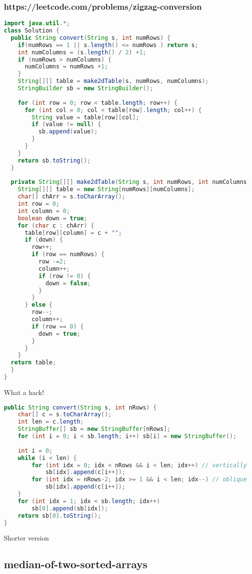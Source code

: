 \documentclass[12pt]{article}
\begin{document}
\subsubsection{https://leetcode.com/problems/zigzag-conversion}
\begin{lstlisting}[language=Java]
import java.util.*;
class Solution {
  public String convert(String s, int numRows) {
    if(numRows == 1 || s.length() <= numRows ) return s;
    int numColumns = (s.length() / 2) +1;
    if (numRows > numColumns) {
      numColumns = numRows +1;
    }
    String[][] table = make2dTable(s, numRows, numColumns);
    StringBuilder sb = new StringBuilder();
        
    for (int row = 0; row < table.length; row++) {
      for (int col = 0; col < table[row].length; col++) {
        String value = table[row][col];
        if (value != null) {
          sb.append(value);
        }
      }
    }
    return sb.toString();
  }
    
  private String[][] make2dTable(String s, int numRows, int numColumns) {
    String[][] table = new String[numRows][numColumns];
    char[] chArr = s.toCharArray();
    int row = 0;
    int column = 0;
    boolean down = true;
    for (char c : chArr) {
      table[row][column] = c + "";
      if (down) {
        row++;
        if (row == numRows) {
          row -=2;
          column++;
          if (row != 0) {
            down = false;
          }
        }
      } else {
        row--;
        column++;
        if (row == 0) {
          down = true;
        }
      }
    }
  return table;
  }   
}
\end{lstlisting}
What a hack!

\begin{lstlisting}[language=Java]
public String convert(String s, int nRows) {
    char[] c = s.toCharArray();
    int len = c.length;
    StringBuffer[] sb = new StringBuffer[nRows];
    for (int i = 0; i < sb.length; i++) sb[i] = new StringBuffer();
    
    int i = 0;
    while (i < len) {
        for (int idx = 0; idx < nRows && i < len; idx++) // vertically down
            sb[idx].append(c[i++]);
        for (int idx = nRows-2; idx >= 1 && i < len; idx--) // obliquely up
            sb[idx].append(c[i++]);
    }
    for (int idx = 1; idx < sb.length; idx++)
        sb[0].append(sb[idx]);
    return sb[0].toString();
}
\end{lstlisting}
Shorter version

\subsection{median-of-two-sorted-arrays} 
\end{document}
